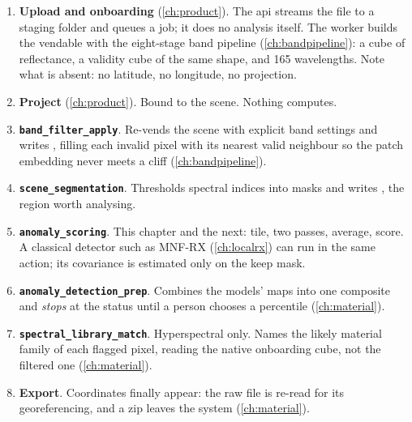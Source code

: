 \begin{enumerate}
\item \textbf{Upload and onboarding} (\cref{ch:product}). The api streams the file to a staging folder and
  queues a  job; it does no analysis itself. The worker builds the vendable with the
  eight-stage band pipeline (\cref{ch:bandpipeline}): a cube  of reflectance, a
  validity cube of the same shape, and 165 wavelengths. Note what is absent: no latitude, no longitude, no
  projection.
\item \textbf{Project} (\cref{ch:product}). Bound to the scene. Nothing computes.
\item \textbf{\texttt{band\_filter\_apply}}. Re-vends the scene with explicit band settings and writes
  , filling each invalid pixel with its nearest valid neighbour so the patch
  embedding never meets a cliff (\cref{ch:bandpipeline}).
\item \textbf{\texttt{scene\_segmentation}}. Thresholds spectral indices into masks and writes
  , the region worth analysing.
\item \textbf{\texttt{anomaly\_scoring}}. This chapter and the next: tile, two passes, average, score. A
  classical detector such as MNF-RX (\cref{ch:localrx}) can run in the same action; its covariance is
  estimated only on the keep mask.
\item \textbf{\texttt{anomaly\_detection\_prep}}. Combines the models' maps into one composite and
  \emph{stops} at the status  until a person chooses a percentile
  (\cref{ch:material}).
\item \textbf{\texttt{spectral\_library\_match}}. Hyperspectral only. Names the likely material family of each
  flagged pixel, reading the native onboarding cube, not the filtered one (\cref{ch:material}).
\item \textbf{Export}. Coordinates finally appear: the raw file is re-read for its georeferencing, and a zip
  leaves the system (\cref{ch:material}).
\end{enumerate}

